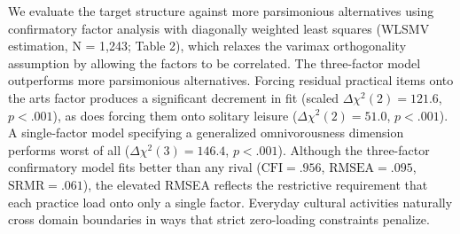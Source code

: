 \documentclass[
  12pt
]{article}
\begin{document}
We evaluate the target structure against more parsimonious alternatives using confirmatory factor analysis with diagonally weighted least squares (WLSMV estimation, N = 1,243; Table 2), which relaxes the varimax orthogonality assumption by allowing the factors to be correlated. The three-factor model outperforms more parsimonious alternatives. Forcing residual practical items onto the arts factor produces a significant decrement in fit (scaled $\Delta\chi^2(2) = 121.6$, $p < .001$), as does forcing them onto solitary leisure ($\Delta\chi^2(2) = 51.0$, $p < .001$). A single-factor model specifying a generalized omnivorousness dimension performs worst of all ($\Delta\chi^2(3) = 146.4$, $p < .001$). Although the three-factor confirmatory model fits better than any rival ($\text{CFI} = .956$, $\text{RMSEA} = .095$, $\text{SRMR} = .061$), the elevated RMSEA reflects the restrictive requirement that each practice load onto only a single factor. Everyday cultural activities naturally cross domain boundaries in ways that strict zero-loading constraints penalize.
\end{document}

